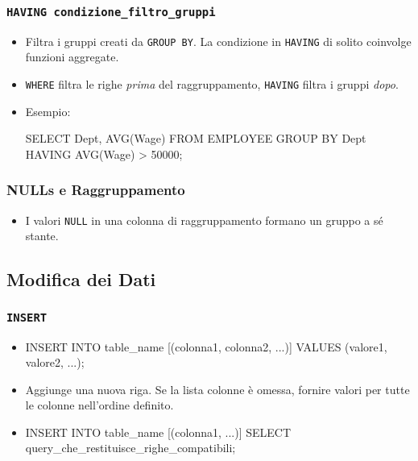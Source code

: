 \documentclass{article}
\begin{document}
	\subsubsection{\texttt{HAVING condizione\_filtro\_gruppi}}
	\begin{itemize}
		\item Filtra i gruppi creati da \texttt{GROUP BY}. La condizione in \texttt{HAVING} di solito coinvolge funzioni aggregate.
		\item \texttt{WHERE} filtra le righe \textit{prima} del raggruppamento, \texttt{HAVING} filtra i gruppi \textit{dopo}.
		\item Esempio:
		\begin{sqlcode}
			SELECT Dept, AVG(Wage) FROM EMPLOYEE
			GROUP BY Dept
			HAVING AVG(Wage) > 50000;
		\end{sqlcode}
	\end{itemize}
	
	\subsubsection{NULLs e Raggruppamento}
	\begin{itemize}
		\item I valori \texttt{NULL} in una colonna di raggruppamento formano un gruppo a sé stante.
	\end{itemize}
	
	\subsection{Modifica dei Dati}
	\subsubsection{\texttt{INSERT}}
	\begin{itemize}
		\item
		\begin{sqlcode}
			INSERT INTO table_name [(colonna1, colonna2, ...)]
			VALUES (valore1, valore2, ...);
		\end{sqlcode}
		\item Aggiunge una nuova riga. Se la lista colonne è omessa, fornire valori per tutte le colonne nell'ordine definito.
		\item
		\begin{sqlcode}
			INSERT INTO table_name [(colonna1, ...)]
			SELECT query_che_restituisce_righe_compatibili;
		\end{sqlcode}
	\end{itemize}
	
\end{document}
